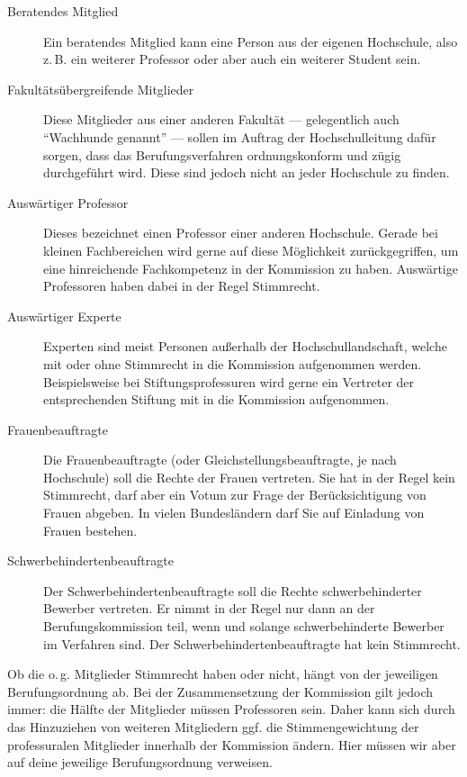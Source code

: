 \begin{description}
    \item [Beratendes Mitglied]
          Ein beratendes Mitglied kann eine Person aus der eigenen Hochschule, also z.\,B. ein weiterer Professor oder aber auch ein weiterer Student sein.

    \item [Fakultätsübergreifende Mitglieder]
          Diese Mitglieder aus einer anderen Fakultät --- gele\-gent\-lich auch "`Wachhunde genannt"' --- sollen im Auftrag der Hochschulleitung dafür sorgen, dass das Berufungsverfahren ordnungskonform und zügig durchgeführt wird. Diese sind jedoch nicht an jeder Hochschule zu finden.

    \item [Auswärtiger Professor]
          Dieses bezeichnet einen Professor einer anderen Hochschule. Gerade bei kleinen Fachbereichen wird gerne auf diese Möglichkeit zurückgegriffen, um eine hinreichende Fachkompetenz in der Kommission zu haben. Auswärtige Professoren haben dabei in der Regel Stimmrecht.

    \item [Auswärtiger Experte]
          Experten sind meist Personen außerhalb der Hochschullandschaft, welche mit oder ohne Stimmrecht in die Kommission aufgenommen werden. Beispielsweise bei Stiftungsprofessuren wird gerne ein Vertreter der entsprechenden Stiftung mit in die Kommission aufgenommen.

    \item [Frauenbeauftragte]
          Die Frauenbeauftragte (oder Gleichstellungsbeauftragte, je nach Hochschule) soll die Rechte der Frauen vertreten. Sie hat in der Regel kein Stimmrecht, darf aber ein Votum zur Frage der Berücksichtigung von
          Frauen abgeben. In vielen Bundesländern darf Sie auf Einladung von Frauen bestehen.

    \item [Schwerbehindertenbeauftragte]
          Der Schwerbehindertenbeauftragte soll die Rechte schwerbehinderter Bewerber vertreten. Er nimmt in der
          Regel nur dann an der Berufungskommission teil, wenn und solange schwerbehinderte Bewerber im Verfahren
          sind. Der Schwerbehindertenbeauftragte hat kein Stimmrecht.

\end{description}

Ob die o.\,g. Mitglieder Stimmrecht haben oder nicht, hängt von der jeweiligen Berufungsordnung ab. Bei der Zusammensetzung der Kommission gilt jedoch immer: die Hälfte der Mitglieder müssen Professoren sein. Daher kann sich durch das Hinzuziehen von weiteren Mitgliedern ggf. die Stimmengewichtung der professuralen Mitglieder innerhalb der Kommission ändern. Hier müssen wir aber auf deine jeweilige Berufungsordnung verweisen.

